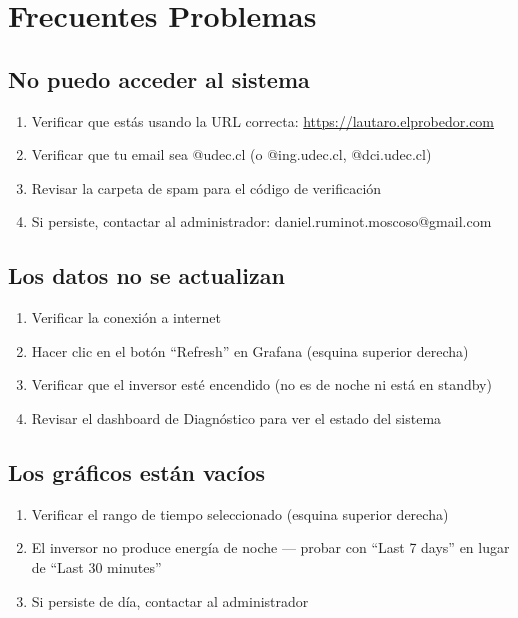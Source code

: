 \documentclass[12pt,a4paper]{article}
\begin{document}
\section{Frecuentes Problemas}

\subsection{No puedo acceder al sistema}

\begin{enumerate}
    \item Verificar que est\'as usando la URL correcta: \url{https://lautaro.elprobedor.com}
    \item Verificar que tu email sea @udec.cl (o @ing.udec.cl, @dci.udec.cl)
    \item Revisar la carpeta de spam para el c\'odigo de verificaci\'on
    \item Si persiste, contactar al administrador: daniel.ruminot.moscoso@gmail.com
\end{enumerate}

\subsection{Los datos no se actualizan}

\begin{enumerate}
    \item Verificar la conexi\'on a internet
    \item Hacer clic en el bot\'on ``Refresh'' en Grafana (esquina superior derecha)
    \item Verificar que el inversor est\'e encendido (no es de noche ni est\'a en standby)
    \item Revisar el dashboard de Diagn\'ostico para ver el estado del sistema
\end{enumerate}

\subsection{Los gr\'aficos est\'an vac\'ios}

\begin{enumerate}
    \item Verificar el rango de tiempo seleccionado (esquina superior derecha)
    \item El inversor no produce energ\'ia de noche --- probar con ``Last 7 days'' en lugar de ``Last 30 minutes''
    \item Si persiste de d\'ia, contactar al administrador
\end{enumerate}
\end{document}
